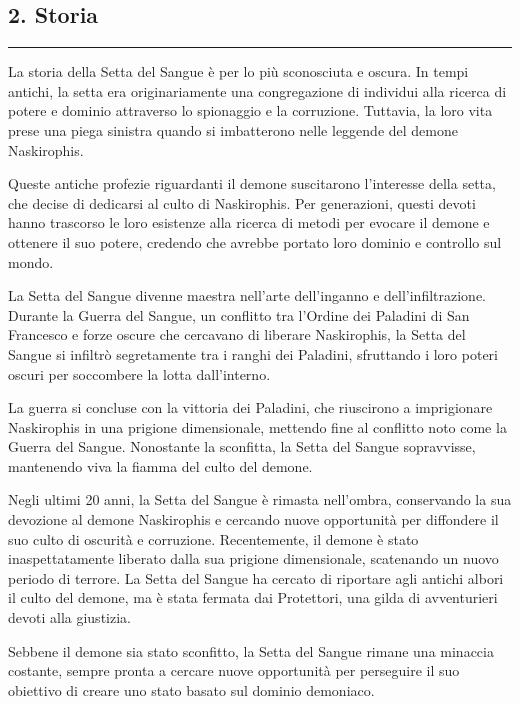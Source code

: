 \subsection{2. Storia}\label{storia}

\begin{center}\rule{0.5\linewidth}{0.5pt}\end{center}

La storia della Setta del Sangue è per lo più sconosciuta e oscura. In
tempi antichi, la setta era originariamente una congregazione di
individui alla ricerca di potere e dominio attraverso lo spionaggio e la
corruzione. Tuttavia, la loro vita prese una piega sinistra quando si
imbatterono nelle leggende del demone Naskirophis.

Queste antiche profezie riguardanti il demone suscitarono l'interesse
della setta, che decise di dedicarsi al culto di Naskirophis. Per
generazioni, questi devoti hanno trascorso le loro esistenze alla
ricerca di metodi per evocare il demone e ottenere il suo potere,
credendo che avrebbe portato loro dominio e controllo sul mondo.

La Setta del Sangue divenne maestra nell'arte dell'inganno e
dell'infiltrazione. Durante la Guerra del Sangue, un conflitto tra
l'Ordine dei Paladini di San Francesco e forze oscure che cercavano di
liberare Naskirophis, la Setta del Sangue si infiltrò segretamente tra i
ranghi dei Paladini, sfruttando i loro poteri oscuri per soccombere la
lotta dall'interno.

La guerra si concluse con la vittoria dei Paladini, che riuscirono a
imprigionare Naskirophis in una prigione dimensionale, mettendo fine al
conflitto noto come la Guerra del Sangue. Nonostante la sconfitta, la
Setta del Sangue sopravvisse, mantenendo viva la fiamma del culto del
demone.

Negli ultimi 20 anni, la Setta del Sangue è rimasta nell'ombra,
conservando la sua devozione al demone Naskirophis e cercando nuove
opportunità per diffondere il suo culto di oscurità e corruzione.
Recentemente, il demone è stato inaspettatamente liberato dalla sua
prigione dimensionale, scatenando un nuovo periodo di terrore. La Setta
del Sangue ha cercato di riportare agli antichi albori il culto del
demone, ma è stata fermata dai Protettori, una gilda di avventurieri
devoti alla giustizia.

Sebbene il demone sia stato sconfitto, la Setta del Sangue rimane una
minaccia costante, sempre pronta a cercare nuove opportunità per
perseguire il suo obiettivo di creare uno stato basato sul dominio
demoniaco.

